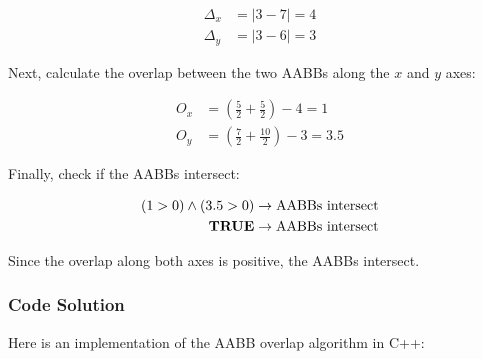 \begin{equation*}
    \begin{aligned}
        \Delta_x & = \left| 3 - 7 \right| = 4 \\
        \Delta_y & = \left| 3 - 6 \right| = 3
    \end{aligned}
\end{equation*}

Next, calculate the overlap between the two AABBs along the $x$ and $y$ axes:

\begin{equation*}
    \begin{aligned}
        O_x & = \left( \frac{5}{2} + \frac{5}{2} \right) - 4 = 1    \\
        O_y & = \left( \frac{7}{2} + \frac{10}{2} \right) - 3 = 3.5
    \end{aligned}
\end{equation*}

Finally, check if the AABBs intersect:

\begin{equation*}
    \begin{aligned}
        (1 > 0) \land (3.5 > 0)    & \rightarrow \text{AABBs intersect} \\
        \textnormal{\textbf{TRUE}} & \rightarrow \text{AABBs intersect}
    \end{aligned}
\end{equation*}

Since the overlap along both axes is positive, the AABBs intersect.

\subsubsection{Code Solution}

Here is an implementation of the AABB overlap algorithm in C++:

